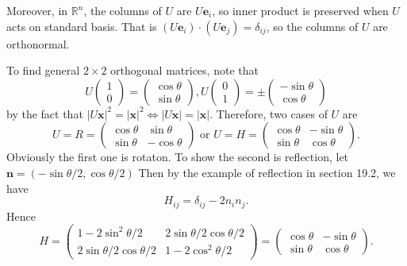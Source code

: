 \documentclass[a4paper]{article}
\begin{document}
    Moreover, in $ \mathbb{R}^{n} $, the columns of $U$ are $ U
    \mathbf{e}_i $, so inner product is preserved when $U$ acts on
    standard basis. That is $ (U \mathbf{e}_i)\cdot(U\mathbf{e}_j)
    =\delta_{ij}$, so the columns of $U$ are orthonormal.
    \begin{example}
      To find general $2\times 2$ orthogonal matrices, note that
      \[
        U
        \begin{pmatrix}
          1\\0
        \end{pmatrix}=
        \begin{pmatrix}
          \cos \theta\\ \sin \theta
        \end{pmatrix},
        U
        \begin{pmatrix}
          0\\1
        \end{pmatrix}=\pm
        \begin{pmatrix}
          -\sin \theta\\ \cos \theta
        \end{pmatrix}
      \]
      by the fact that $ |U \mathbf{x}|^2=|\mathbf{x}|^2
      \Leftrightarrow |U \mathbf{x}|=| \mathbf{x}| $. Therefore, two
      cases of $U$ are
      \[
        U=R=
        \begin{pmatrix}
          \cos \theta & \sin \theta\\
          \sin \theta & -\cos \theta
        \end{pmatrix} \text{ or } U=H=
        \begin{pmatrix}
          \cos \theta & -\sin \theta\\
          \sin \theta & \cos \theta
        \end{pmatrix}
      .\]
      Obviously the first one is rotaton. To show the second is
      reflection, let $ \mathbf{n}=(-\sin \theta/2, \cos \theta/2) $
      Then by the example of reflection in section 19.2, we have
      \[
        H_{ij}=\delta_{ij}-2n_in_j
      .\]
      Hence
      \[
        H=
        \begin{pmatrix}
          1-2 \sin ^{2} \theta / 2 & 2 \sin \theta / 2 \cos \theta / 2 \\
          2 \sin \theta / 2 \cos \theta / 2 & 1-2 \cos ^{2} \theta / 2
        \end{pmatrix}=
        \begin{pmatrix}
          \cos \theta & -\sin \theta\\
          \sin \theta & \cos \theta
        \end{pmatrix}
      .\]
    \end{example}
\end{document}
